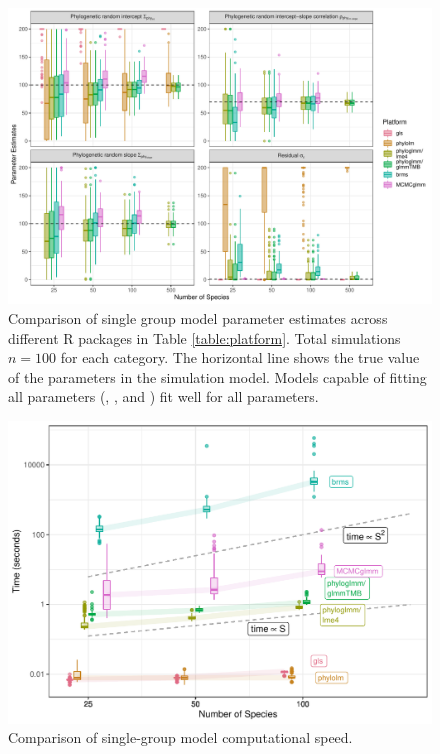 \documentclass[12pt]{article}
\begin{document}
\begin{center}
\begin{figure}[H]
  \includegraphics[scale=0.7]{./figure/ssplot.pdf}
  \caption{Comparison of single group model parameter estimates across different R packages in Table \ref{table:platform}.
    Total simulations $n=100$ for each category. The horizontal line shows the true value of the parameters in the simulation model. Models capable of fitting all parameters (\pkg{\plmefour},  \pkg{\pgTMB}, and ) fit well for all parameters.
}
\label{ssplot}
\end{figure}
\end{center}
\begin{center}
\begin{figure}[H]
  \includegraphics[scale=0.7]{./figure/csstime.pdf}
  \caption{Comparison of single-group model computational speed.}
\label{ssplot_speed}
\end{figure}
\end{center}
\end{document}

